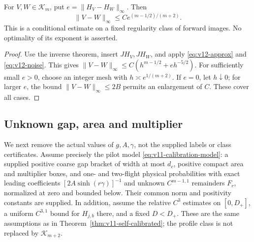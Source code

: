 \begin{corollary}
\label{cor:v12-modulus}
For $V,W\in\mathcal K_m$, put $e=\|H_V-H_W\|_\infty$.
Then
\begin{equation}\label{eq:v12-modulus}
             \|V-W\|_\infty\le C e^{(m-1/2)/(m+2)}.
\end{equation}
This is a conditional estimate on a fixed regularity class of forward
images. No optimality of its exponent is asserted.
\end{corollary}
\begin{proof}
Use the inverse theorem, insert $JH_V,JH_W$, and apply
\eqref{eq:v12-approx} and \eqref{eq:v12-noise}. This gives
$\|V-W\|_\infty\le C(h^{m-1/2}+e h^{-5/2})$.
For sufficiently small $e>0$, choose an integer mesh with
$h\asymp e^{1/(m+2)}$. If $e=0$, let $h\downarrow0$;
for larger $e$, the bound $\|V-W\|_\infty\le2B$ permits
an enlargement of $C$. These cover all cases.
\end{proof}

\subsection{Unknown gap, area and multiplier}
We next remove the actual values of $g,A,\gamma$, not the supplied
labels or class certificates. Assume precisely the pilot model
\eqref{eq:v11-calibration-model}: a supplied positive coarse gap
bracket of width at most $d_c$, positive compact area and multiplier
boxes, and one- and two-flight physical probabilities with exact
leading coefficients $[2A\sinh(r\gamma)]^{-1}$ and unknown
$C^{m-1,1}$ remainders $F_r$, normalized at zero and bounded below.
Their common norm and positivity constants are supplied. In addition,
assume the relative $C^3$ estimates on $[0,D_+]$, a uniform
$C^{3,1}$ bound for $H_{j,b}$ there, and a fixed $D<D_+$.
These are the same assumptions as in
Theorem~\ref{thm:v11-self-calibrated}; the profile class is not
replaced by $\mathcal K_{m+2}$.

